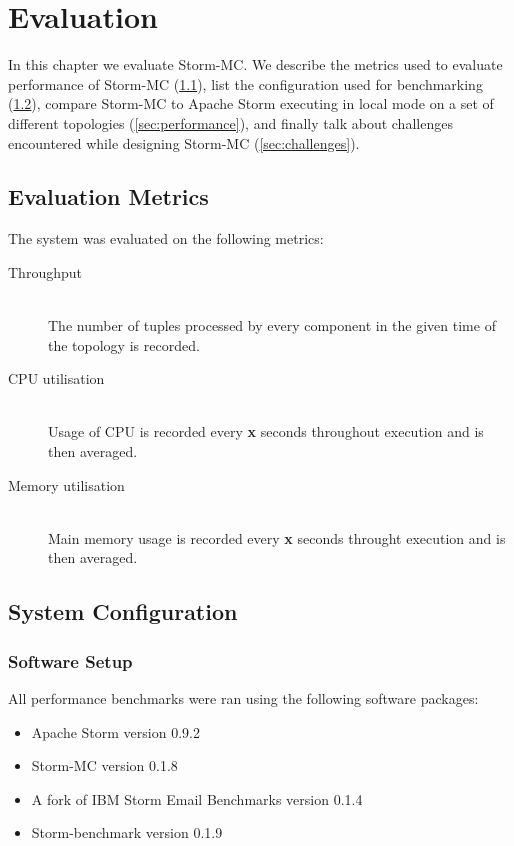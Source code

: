 \chapter{Evaluation}

In this chapter we evaluate Storm-MC. We describe the metrics used to evaluate performance of Storm-MC (\ref{sec:metrics}), list the configuration used for benchmarking (\ref{sec:system_conf}), compare Storm-MC to Apache Storm executing in local mode on a set of different topologies (\ref{sec:performance}), and finally talk about challenges encountered while designing Storm-MC (\ref{sec:challenges}).

\section{Evaluation Metrics}
\label{sec:metrics}

The system was evaluated on the following metrics:

\begin{description}
	\item[Throughput] \hfill \\
	The number of tuples processed by every component in the given time of the topology is recorded.
	\item[CPU utilisation] \hfill \\
	Usage of CPU is recorded every \textbf{x} seconds throughout execution and is then averaged.
	\item[Memory utilisation] \hfill \\
	Main memory usage is recorded every \textbf{x} seconds throught execution and is then averaged.
\end{description}

\section{System Configuration}
\label{sec:system_conf}

\subsection{Software Setup}


All performance benchmarks were ran using the following software packages:

\begin{itemize}
	\item Apache Storm version 0.9.2
	\item Storm-MC version 0.1.8
	\item A fork of IBM Storm Email Benchmarks version 0.1.4
	\item Storm-benchmark version 0.1.9
\end{itemize}

